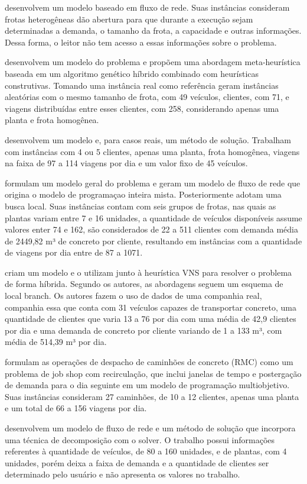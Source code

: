 \cite{tabref2} desenvolvem um modelo baseado em fluxo de rede. Suas instâncias consideram frotas heterogêneas dão abertura para que durante a execução sejam determinadas a demanda, o tamanho da frota, a capacidade e outras informações. Dessa forma, o leitor não tem acesso a essas informações sobre o problema.

\cite{tabref3} desenvolvem um modelo do problema e propõem uma abordagem meta-heu\-rís\-ti\-ca baseada em um algoritmo genético híbrido combinado com heurísticas construtivas. Tomando uma instância real como referência geram instâncias aleatórias com o mesmo tamanho de frota, com 49 veículos, clientes, com 71, e viagens distribuídas entre esses clientes, com 258, considerando apenas uma planta e frota homogênea.

\cite{tabref4} desenvolvem um modelo e, para casos reais, um método de solução. Trabalham com instâncias com 4 ou 5 clientes, apenas uma planta, frota homogênea, viagens na faixa de 97 a 114 viagens por dia e um valor fixo de 45 veículos. 

\cite{asbach} formulam um modelo geral do problema e geram um modelo de fluxo de rede que origina o modelo de programaçao inteira mista. Posteriormente adotam uma busca local. Suas instâncias contam com seis grupos de frotas, nas quais as plantas variam entre 7 e 16 unidades, a quantidade de veículos  disponíveis assume valores enter 74 e 162, são considerados de 22 a 511 clientes com demanda média de 2449,82 m³ de concreto por cliente, resultando em instâncias com a quantidade de viagens por dia entre de 87 a 1071. 

\cite{tabref6} criam um modelo e o utilizam junto à heurística VNS para resolver o problema de forma híbrida. Segundo os autores, as abordagens seguem um esquema de local branch. Os autores fazem o uso de dados de uma companhia real, companhia essa que conta com 31 veículos capazes de transportar concreto, uma quantidade de clientes que varia 13 a 76 por dia com uma média de 42,9 clientes por dia e uma demanda de concreto por cliente variando de 1 a 133 m³, com média de 514,39 m³ por dia. 

\cite{tabref7} formulam as operações de despacho de caminhões de concreto (RMC) como um problema de job shop com recirculação, que inclui janelas de tempo e postergação de demanda para o dia seguinte em um modelo de programação multiobjetivo. Suas instâncias consideram 27 caminhões, de 10 a 12 clientes, apenas uma planta e um total de 66 a 156 viagens por dia.

\cite{tabref8} desenvolvem um modelo de fluxo de rede e um método de solução que incorpora uma técnica de decomposição com o solver. O trabalho possui informações referentes à quantidade de veículos, de 80 a 160 unidades, e de plantas, com 4 unidades, porém deixa a faixa de demanda e a quantidade de clientes ser determinado pelo usuário e não apresenta os valores no trabalho.


